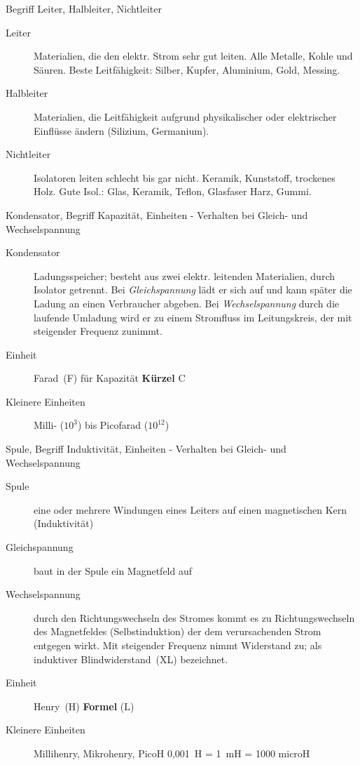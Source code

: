 \documentclass[avery5371,grid,frame,a4paper]{flashcards}
\newcommand{\card}[3]{
  \begin{flashcard}[{\chap} -- #1]{#2}#3\end{flashcard}
}
\begin{document}
\card{02}{Begriff Leiter, Halbleiter, Nichtleiter}{
  \small
  \begin{description}
    \item[Leiter]
      Materialien, die den elektr. Strom sehr gut leiten. Alle Metalle, Kohle und Säuren.
      Beste Leitfähigkeit: Silber, Kupfer, Aluminium, Gold, Messing.
    \item[Halbleiter] Materialien, die Leitfähigkeit
      aufgrund physikalischer oder elektrischer Einflüsse ändern
      (Silizium, Germanium).
    \item[Nichtleiter] Isolatoren leiten schlecht bis gar nicht.
      Keramik, Kunststoff, trockenes Holz.
      Gute Isol.: Glas, Keramik, Teflon, Glasfaser Harz, Gummi.
  \end{description}
}


\card{03}{Kondensator, Begriff Kapazität, Einheiten - Verhalten bei Gleich- und Wechselspannung}{
  \small
  \begin{description}
    \item[Kondensator]
      Ladungsspeicher; besteht aus zwei elektr. leitenden Materialien, durch Isolator getrennt.
      Bei \emph{Gleichspannung} lädt er sich auf und kann später die Ladung an einen Verbraucher abgeben.
      Bei \emph{Wechselspannung} durch die laufende Umladung wird er zu einem Stromfluss im Leitungskreis,
      der mit steigender Frequenz zunimmt.
    \item[Einheit] Farad~(F) für Kapazität  \hspace{20pt} \textbf{Kürzel} C
    \item[Kleinere Einheiten] Milli- ($10^3$) bis Picofarad ($10^{12}$)
  \end{description}
}

\card{04}{Spule, Begriff Induktivität, Einheiten - Verhalten bei Gleich- und Wechselspannung}{
  \footnotesize
  \begin{description}
    \item[Spule] eine oder mehrere Windungen eines Leiters auf einen magnetischen Kern (Induktivität)
    \item[Gleichspannung] baut in der Spule ein Magnetfeld auf
    \item[Wechselspannung] durch den Richtungswechseln des Stromes kommt es zu Richtungswechseln des Magnetfeldes (Selbstinduktion) der dem verursachenden Strom entgegen wirkt.
    Mit steigender Frequenz nimmt Widerstand zu; als induktiver Blindwiderstand~(XL) bezeichnet.
    \item[Einheit] Henry~(H)   \hspace{50pt} \textbf{Formel} (L)
    \item[Kleinere Einheiten] Millihenry, Mikrohenry, PicoH 0,001~H = 1~mH = 1000 microH
  \end{description}
}
\end{document}

